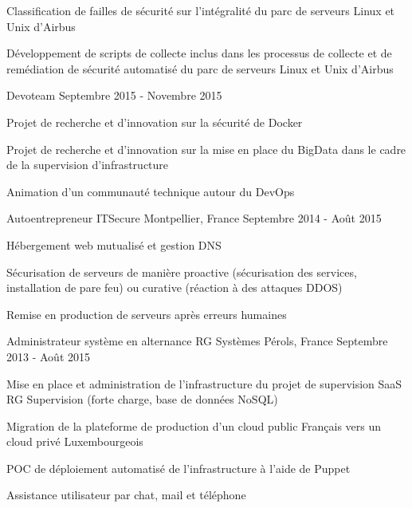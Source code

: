 \begin{cventries}
{\begin{cvsubentries}
{\begin{cvitems}
              \item {Classification de failles de sécurité sur l'intégralité du parc de serveurs Linux et Unix d'Airbus}
              \item {Développement de scripts de collecte inclus dans les processus de collecte et de remédiation de sécurité automatisé du parc de serveurs Linux et Unix d'Airbus}
            \end{cvitems}
          }
        \cvsubentry
          {}
          {Devoteam}
          {Septembre 2015 - Novembre 2015}
          {
            \begin{cvitems} %
              \item {Projet de recherche et d'innovation sur la sécurité de Docker}
              \item {Projet de recherche et d'innovation sur la mise en place du BigData dans le cadre de la supervision d'infrastructure}
              \item {Animation d'un communauté technique autour du DevOps}
            \end{cvitems}
          }
      \end{cvsubentries}
    }

  \cventry
    {Autoentrepreneur} %
    {ITSecure} %
    {Montpellier, France} %
    {Septembre 2014 - Août 2015} %
    {
      \begin{cvitems} %
        \item {Hébergement web mutualisé et gestion DNS}
        \item {Sécurisation de serveurs de manière proactive (sécurisation des services, installation de pare feu) ou curative (réaction à des attaques DDOS)}
        \item {Remise en production de serveurs après erreurs humaines}
      \end{cvitems}
    }

  \cventry
    {Administrateur système en alternance} %
    {RG Systèmes} %
    {Pérols, France} %
    {Septembre 2013 - Août 2015} %
    {
      \begin{cvitems} %
        \item {Mise en place et administration de l'infrastructure du projet de supervision SaaS RG Supervision (forte charge, base de données NoSQL)}
        \item {Migration de la plateforme de production d'un cloud public Français vers un cloud privé Luxembourgeois}
        \item {POC de déploiement automatisé de l'infrastructure à l'aide de Puppet}
        \item {Assistance utilisateur par chat, mail et téléphone}
      \end{cvitems}
    }


\end{cventries}
